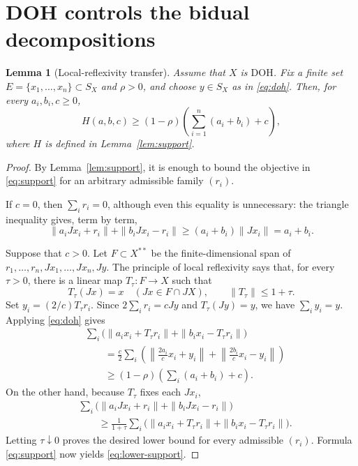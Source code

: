 \documentclass[11pt]{article}
\newtheorem{lemma}[theorem]{Lemma}
\newcommand{\J}{J}
\newcommand{\DOH}{\mathrm{DOH}}
\begin{document}
\section{DOH controls the bidual decompositions}

\begin{lemma}[Local-reflexivity transfer]\label{lem:lr}
Assume that $X$ is $\DOH$.  Fix a finite set
$E=\{x_1,\ldots,x_n\}\subset S_X$ and $\rho>0$, and choose $y\in S_X$
as in \eqref{eq:doh}.  Then, for every $a_i,b_i,c\ge0$,
\begin{equation}\label{eq:lower-support}
 H(a,b,c)\ge
 (1-\rho)\left(\sum_{i=1}^n(a_i+b_i)+c\right),
\end{equation}
where $H$ is defined in Lemma~\ref{lem:support}.
\end{lemma}

\begin{proof}
By Lemma~\ref{lem:support}, it is enough to bound the objective in
\eqref{eq:support} for an arbitrary admissible family $(r_i)$.

If $c=0$, then $\sum_i r_i=0$, although even this equality is unnecessary:
the triangle inequality gives, term by term,
\[
 \|a_i\J x_i+r_i\|+\|b_i\J x_i-r_i\|
 \ge(a_i+b_i)\|\J x_i\|=a_i+b_i.
\]

Suppose that $c>0$.  Let $F\subset X^{**}$ be the finite-dimensional span
of $r_1,\ldots,r_n,\J x_1,\ldots,\J x_n,\J y$.  The principle of local
reflexivity \cite{LR} says that, for every $\tau>0$, there is a linear map
$T_\tau:F\to X$ such that
\[
 T_\tau(\J x)=x\quad(\J x\in F\cap\J X),
 \qquad \|T_\tau\|\le1+\tau.
\]
Set $y_i=(2/c)T_\tau r_i$.  Since $2\sum_i r_i=c\J y$ and
$T_\tau(\J y)=y$, we have $\sum_i y_i=y$.  Applying \eqref{eq:doh} gives
\begin{align*}
 &\sum_i\bigl(\|a_i x_i+T_\tau r_i\|
                  +\|b_i x_i-T_\tau r_i\|\bigr)\\
 &\qquad=\frac c2\sum_i
 \left(\left\|\frac{2a_i}{c}x_i+y_i\right\|
       +\left\|\frac{2b_i}{c}x_i-y_i\right\|\right)\\
 &\qquad\ge(1-\rho)\left(\sum_i(a_i+b_i)+c\right).
\end{align*}
On the other hand, because $T_\tau$ fixes each $\J x_i$,
\begin{align*}
 &\sum_i\bigl(\|a_i\J x_i+r_i\|+
                   \|b_i\J x_i-r_i\|\bigr)\\
 &\qquad\ge\frac1{1+\tau}
 \sum_i\bigl(\|a_i x_i+T_\tau r_i\|
                  +\|b_i x_i-T_\tau r_i\|\bigr).
\end{align*}
Letting $\tau\downarrow0$ proves the desired lower bound for every
admissible $(r_i)$.  Formula \eqref{eq:support} now yields
\eqref{eq:lower-support}.
\end{proof}
\end{document}
